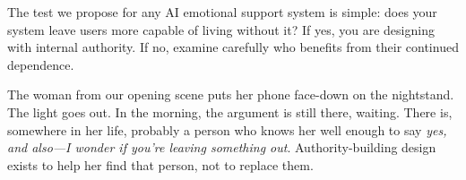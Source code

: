 \documentclass[sigchi,review,anonymous]{acmart}
\begin{document}
The test we propose for any AI emotional support system is simple: does your system leave
users more capable of living without it? If yes, you are designing with internal authority.
If no, examine carefully who benefits from their continued dependence.

The woman from our opening scene puts her phone face-down on the nightstand. The light goes
out. In the morning, the argument is still there, waiting. There is, somewhere in her life,
probably a person who knows her well enough to say \emph{yes, and also---I wonder if you're
leaving something out}. Authority-building design exists to help her find that person, not to
replace them.



\end{document}
